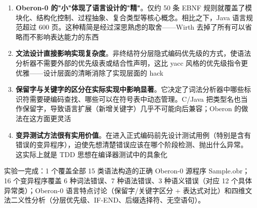 \documentclass[12pt,a4paper,fontset=none]{ctexart}
\begin{document}
\begin{enumerate}
  \item \textbf{Oberon-0 的"小"体现了语言设计的"精"}。仅约 50 条 EBNF 规则就覆盖了模块化、结构化控制、过程抽象、复合类型等核心概念。相比之下，Java 语言规范超过 600 页。这种精简是经过深思熟虑的取舍——Wirth 去掉了所有可以省略而不影响表达能力的东西
  \item \textbf{文法设计直接影响实现复杂度}。非终结符分层隐式编码优先级的方式，使语法分析器不需要外部的优先级表或结合性声明，这比 yacc 风格的优先级指令更优雅——设计层面的清晰消除了实现层面的 hack
  \item \textbf{保留字与关键字的区分在实际实现中影响显著}。它决定了词法分析器中哪些标识符需要硬编码查找、哪些可以在符号表中动态管理。C/Java 把类型名也当作保留字，导致语言扩展（新增关键字）几乎不可能向后兼容；Oberon 的做法在这方面更灵活
  \item \textbf{变异测试方法很有实用价值}。在进入正式编码前先设计测试用例（特别是含有错误的变异程序），迫使先想清楚错误应该在哪个阶段检测、抛出什么异常。这实际上就是 TDD 思想在编译器测试中的具象化
\end{enumerate}

\begin{summaryBox}
实验一完成：1 个覆盖全部 15 类语法构造的正确 Oberon-0 源程序 Sample.obr；16 个变异程序覆盖 6 种词法错误、7 种语法错误、3 种语义错误（对应 12 个具体异常类）；Oberon-0 语言特点讨论（保留字/关键字区分 + 表达式对比）和四维文法二义性分析（分层优先级、IF-END、后缀选择符、无空语句）。
\end{summaryBox}
\end{document}
